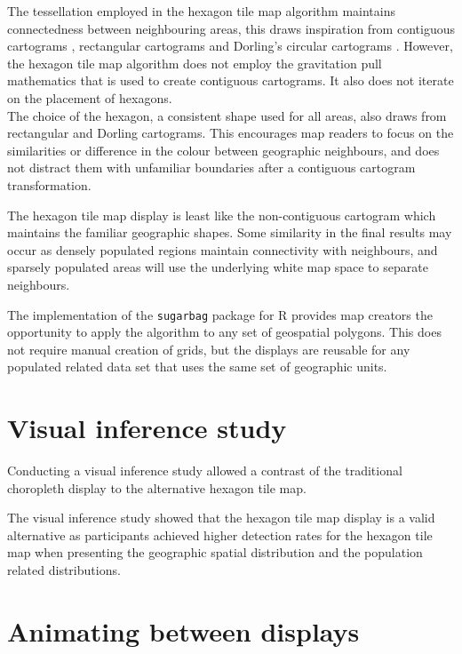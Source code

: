 \documentclass{monashthesis}
\begin{document}
The tessellation employed in the hexagon tile map algorithm maintains connectedness between neighbouring areas, this draws inspiration from contiguous cartograms \autocite{ACA}, rectangular cartograms \autocite{RSCW} and Dorling's circular cartograms \autocite{ACTUC}. However, the hexagon tile map algorithm does not employ the gravitation pull mathematics that is used to create contiguous cartograms. It also does not iterate on the placement of hexagons.\\
The choice of the hexagon, a consistent shape used for all areas, also draws from rectangular and Dorling cartograms. This encourages map readers to focus on the similarities or difference in the colour between geographic neighbours, and does not distract them with unfamiliar boundaries after a contiguous cartogram transformation.

The hexagon tile map display is least like the non-contiguous cartogram \autocite{NAC} which maintains the familiar geographic shapes. Some similarity in the final results may occur as densely populated regions maintain connectivity with neighbours, and sparsely populated areas will use the underlying white map space to separate neighbours.

The implementation of the \texttt{sugarbag} \autocite{sugarbag} package for R \autocite{R} provides map creators the opportunity to apply the algorithm to any set of geospatial polygons. This does not require manual creation of grids, but the displays are reusable for any populated related data set that uses the same set of geographic units.

\hypertarget{visual-inference-study-1}{%
\section{Visual inference study}\label{visual-inference-study-1}}

Conducting a visual inference study allowed a contrast of the traditional choropleth display to the alternative hexagon tile map.

The visual inference study showed that the hexagon tile map display is a valid alternative as participants achieved higher detection rates for the hexagon tile map when presenting the geographic spatial distribution and the population related distributions.

\hypertarget{animating-between-displays}{%
\section{Animating between displays}\label{animating-between-displays}}
\end{document}
